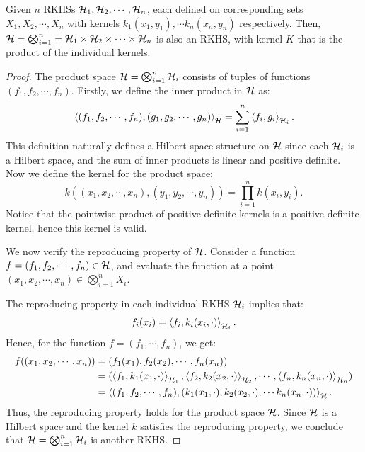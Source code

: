 \begin{lemma}
\label{lemma: product of rkhs}
    Given $n$ RKHSs ${\mathcal{H}}_1, {\mathcal{H}}_2, \cdots, {\mathcal{H}}_n$, each defined on corresponding sets $X_1, X_2, \cdots, X_n$ with kernels $k_1(x_1, y_1), \cdots k_n(x_n, y_n)$ respectively. Then, ${\mathcal{H}} = \bigotimes_{i = 1}^n = {\mathcal{H}}_1 \times {\mathcal{H}}_2 \times \cdots \times {\mathcal{H}}_n$ is also an RKHS, with kernel $K$ that is the product of the individual kernels. 
\end{lemma}
\begin{proof}
    The product space ${\mathcal{H}} = \bigotimes_{i=1}^n {\mathcal{H}}_i$ consists of tuples of functions $(f_1, f_2, \cdots, f_n)$. Firstly, we define the inner product in ${\mathcal{H}}$ as:
    \begin{equation*}
        \left< (f_1, f_2, \cdots, f_n), (g_1, g_2, \cdots, g_n)\right>_{\mathcal{H}} = \sum^n_{i=1}\left<f_i, g_i\right>_{{\mathcal{H}}_i}.
    \end{equation*}
    This definition naturally defines a Hilbert space structure on ${\mathcal{H}}$ since each ${\mathcal{H}}_i$ is a Hilbert space, and the sum of inner products is linear and positive definite. Now we define the kernel for the product space:
    \begin{equation*}
        k((x_1, x_2, \cdots, x_n), (y_1, y_2, \cdots, y_n)) = \prod_{i=1}^n k(x_i, y_i).
    \end{equation*}
    Notice that the pointwise product of positive definite kernels is a positive definite kernel, hence this kernel is valid.

    We now verify the reproducing property of ${\mathcal{H}}$. Consider a function $f = (f_1, f_2, \cdots, f_n) \in {\mathcal{H}}$, and evaluate the function at a point $(x_1, x_2, \cdots, x_n) \in \bigotimes_{i=1}^n X_i$. 

    The reproducing property in each individual RKHS ${\mathcal{H}}_i$ implies that:
    \begin{equation*}
        f_i(x_i) = \left< f_i, k_i(x_i, \cdot) \right>_{{\mathcal{H}}_i}.
    \end{equation*}
    Hence, for the function $f = (f_1, \cdots, f_n)$, we get:
    \begin{align*}
        f((x_1, x_2, \cdots, x_n)) &= (f_1(x_1), f_2(x_2),\cdots,f_n(x_n))\\
        &=(\left<f_1, k_1(x_1, \cdot)\right>_{{\mathcal{H}}_1}, \left<f_2, k_2(x_2, \cdot)\right>_{{\mathcal{H}}_2},\cdots,\left<f_n, k_n(x_n, \cdot)\right>_{{\mathcal{H}}_n})\\
        &=\left<(f_1,f_2,\cdots,f_n),(k_1(x_1,\cdot),k_2(x_2,\cdot),\cdots k_n(x_n,\cdot))\right>_{\mathcal{H}}.
    \end{align*}
    Thus, the reproducing property holds for the product space ${\mathcal{H}}$. Since ${\mathcal{H}}$ is a Hilbert space and the kernel $k$ satisfies the reproducing property, we conclude that ${\mathcal{H}} = \bigotimes^n_{i=1} {\mathcal{H}}_i$ is another RKHS.  
\end{proof}
